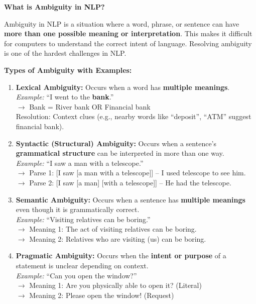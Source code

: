 \documentclass[12pt,a4paper]{article}
\newcommand{\term}[1]{\textbf{\color{headingcolor}#1}}
\begin{document}
\begin{answerenv}

\textbf{\color{headingcolor}What is Ambiguity in NLP?}

Ambiguity in NLP is a situation where a word, phrase, or sentence can have \textbf{more than one possible meaning or interpretation}. This makes it difficult for computers to understand the correct intent of language. Resolving ambiguity is one of the hardest challenges in NLP.

\vspace{6pt}
\textbf{\color{headingcolor}Types of Ambiguity with Examples:}

\begin{enumerate}[leftmargin=1.8em, itemsep=7pt]
  \item \term{Lexical Ambiguity:}
  Occurs when a word has \textbf{multiple meanings}.\\
  \textit{Example:} ``I went to the \textbf{bank}.''\\
  $\to$ Bank = River bank OR Financial bank\\
  Resolution: Context clues (e.g., nearby words like ``deposit'', ``ATM'' suggest financial bank).

  \item \term{Syntactic (Structural) Ambiguity:}
  Occurs when a sentence's \textbf{grammatical structure} can be interpreted in more than one way.\\
  \textit{Example:} ``I saw a man with a telescope.''\\
  $\to$ Parse 1: [I saw [a man with a telescope]] -- I used telescope to see him.\\
  $\to$ Parse 2: [I saw [a man] [with a telescope]] -- He had the telescope.

  \item \term{Semantic Ambiguity:}
  Occurs when a sentence has \textbf{multiple meanings} even though it is grammatically correct.\\
  \textit{Example:} ``Visiting relatives can be boring.''\\
  $\to$ Meaning 1: The act of visiting relatives can be boring.\\
  $\to$ Meaning 2: Relatives who are visiting (us) can be boring.

  \item \term{Pragmatic Ambiguity:}
  Occurs when the \textbf{intent or purpose} of a statement is unclear depending on context.\\
  \textit{Example:} ``Can you open the window?''\\
  $\to$ Meaning 1: Are you physically able to open it? (Literal)\\
  $\to$ Meaning 2: Please open the window! (Request)


\end{enumerate}
\end{answerenv}
\end{document}
